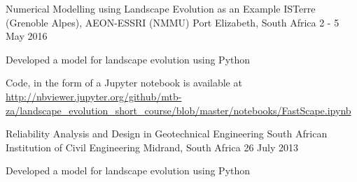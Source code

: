 


\begin{cventries}


\cventry
{Numerical Modelling using Landscape Evolution as an Example} %
{ISTerre (Grenoble Alpes), AEON-ESSRI (NMMU)} %
{Port Elizabeth, South Africa} %
{2 - 5 May 2016} %
{ %
\begin{cvitems}
\item {Developed a model for landscape evolution using Python}
\item {Code, in the form of a Jupyter notebook is available at \url{http://nbviewer.jupyter.org/github/mtb-za/landscape_evolution_short_course/blob/master/notebooks/FastScape.ipynb}}
\end{cvitems}
}


\cventry
{Reliability Analysis and Design in Geotechnical Engineering} %
{South African Institution of Civil Engineering} %
{Midrand, South Africa} %
{26 July 2013} %
{ %
\begin{cvitems}
\item {Developed a model for landscape evolution using Python}
\end{cvitems}
}


\end{cventries}